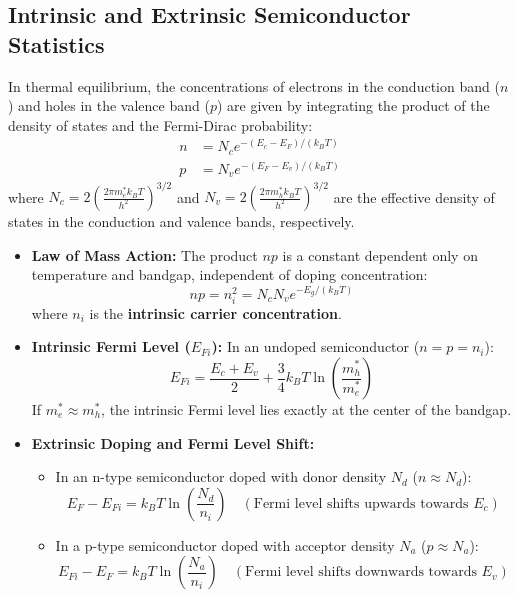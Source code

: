 \subsection{Intrinsic and Extrinsic Semiconductor Statistics}
In thermal equilibrium, the concentrations of electrons in the conduction band ($n$) and holes in the valence band ($p$) are given by integrating the product of the density of states and the Fermi-Dirac probability:
\begin{align}
    n &= N_c e^{-(E_c - E_F)/(k_B T)} \\
    p &= N_v e^{-(E_F - E_v)/(k_B T)}
\end{align}
where $N_c = 2\left(\frac{2\pi m_e^* k_B T}{h^2}\right)^{3/2}$ and $N_v = 2\left(\frac{2\pi m_h^* k_B T}{h^2}\right)^{3/2}$ are the effective density of states in the conduction and valence bands, respectively.
\begin{itemize}
    \item \textbf{Law of Mass Action:} The product $n p$ is a constant dependent only on temperature and bandgap, independent of doping concentration:
    \begin{equation}
        n p = n_i^2 = N_c N_v e^{-E_g / (k_B T)}
    \end{equation}
    where $n_i$ is the \textbf{intrinsic carrier concentration}.
    \item \textbf{Intrinsic Fermi Level ($E_{Fi}$):} In an undoped semiconductor ($n = p = n_i$):
    \begin{equation}
        E_{Fi} = \frac{E_c + E_v}{2} + \frac{3}{4} k_B T \ln\left(\frac{m_h^*}{m_e^*}\right)
    \end{equation}
    If $m_e^* \approx m_h^*$, the intrinsic Fermi level lies exactly at the center of the bandgap.
    \item \textbf{Extrinsic Doping and Fermi Level Shift:}
    \begin{itemize}
        \item In an n-type semiconductor doped with donor density $N_d$ ($n \approx N_d$):
        \begin{equation}
            E_F - E_{Fi} = k_B T \ln\left(\frac{N_d}{n_i}\right) \quad (\text{Fermi level shifts upwards towards } E_c)
        \end{equation}
        \item In a p-type semiconductor doped with acceptor density $N_a$ ($p \approx N_a$):
        \begin{equation}
            E_{Fi} - E_F = k_B T \ln\left(\frac{N_a}{n_i}\right) \quad (\text{Fermi level shifts downwards towards } E_v)
        \end{equation}
    \end{itemize}
\end{itemize}

